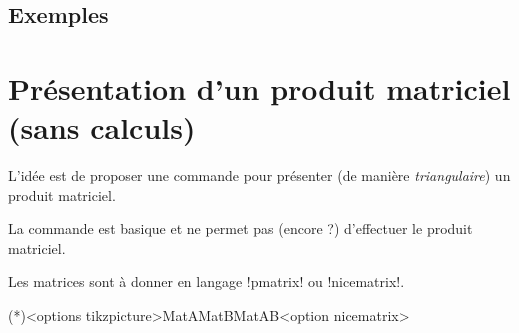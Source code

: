 \documentclass[french,a4paper,11pt]{article}
\begin{document}
{{\subsection{Exemples}

\begin{DemoCode}[]
\end{DemoCode}

\begin{DemoCode}[]
\end{DemoCode}

\begin{DemoCode}[]
\end{DemoCode}

\begin{DemoCode}[]
\end{DemoCode}

\begin{DemoCode}[]
\end{DemoCode}

\pagebreak

\section{Présentation d'un produit matriciel (sans calculs)}

\begin{tipblock}
L'idée est de proposer une commande pour présenter (de manière \textit{triangulaire}) un produit matriciel.

\smallskip

La commande est basique et ne permet pas (encore ?) d'effectuer le produit matriciel.

\smallskip

Les matrices sont à donner en langage \motcletex!pmatrix! ou \motcletex!nicematrix!.
\end{tipblock}

\begin{DemoCode}
\PresentProdMat(*)<options tikzpicture>{MatA}{MatB}{MatAB}<option nicematrix>
\end{DemoCode}

\begin{DemoCode}[]
\end{DemoCode}

}}
\end{document}
